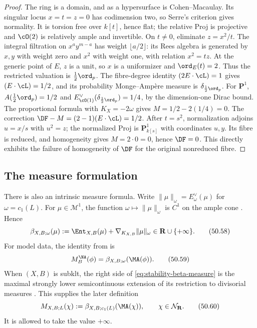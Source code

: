\begin{proof}
The ring is a domain, and as a hypersurface is Cohen--Macaulay.  Its
singular locus $x=t=z=0$ has codimension two, so Serre's criterion
gives normality.  It is torsion free over $k[t]$, hence flat; the
relative Proj is projective and $\cO(2)$ is relatively ample and
invertible.  On $t\ne0$, eliminate $z=x^2/t$.
The integral filtration on $x^ay^{m-a}$ has weight
$\lfloor a/2\rfloor$: its Rees algebra is generated by $x,y$
with weight zero and $x^2$ with weight one, with relation $x^2=tz$.
At the generic point of $E$, $z$ is a unit, so $x$ is a
uniformizer and $\ord_E(t)=2$.  Thus the restricted valuation is
$\frac12\ord_p$.  The fibre-degree identity
$(2E\cdot\cL)=1$ gives $(E\cdot\cL)=1/2$, and its probability
Monge--Amp\`ere measure is $\delta_{\frac12\ord_p}$.
For $\mathbf P^1$, $A(\frac12\ord_p)=1/2$ and
$E^\vee_{\cO(1)}(\delta_{\frac12\ord_p})=1/4$, by the dimension-one
Dirac bound.  The proportional formula with $K_X=-2\omega$ gives
$M=1/2-2(1/4)=0$.  The correction
$\DF-M=(2-1)(E\cdot\cL)=1/2$.
After $t=s^2$, normalization adjoins $u=x/s$ with $u^2=z$;
the normalized Proj is $\mathbf P^1_{k[s]}$ with coordinates $u,y$.
Its fibre is reduced, and homogeneity gives $M=2\cdot0=0$, hence
$\DF=0$.  This directly exhibits the failure of homogeneity of
$\DF$ for the original nonreduced fibre.
\end{proof}

\subsection{The measure formulation}
\label{sec:ch50-beta}

There is also an intrinsic measure formula.  Write
$\|\mu\|_\omega=E_\omega^\vee(\mu)$ for $\omega=c_1(L)$.  For
$\mu\in\mathcal M^1$, the function
$\omega\mapsto\|\mu\|_\omega$ is $C^1$ on the ample cone
\cite[Theorem~2.15]{BJKS2}.  Hence
\[
 \beta_{X,B;\omega}(\mu)
 :=\Ent_{X,B}(\mu)
       +\nabla_{K_{X,B}}\|\mu\|_\omega
 \in\mathbf R\cup\{+\infty\}.
\tag{50.58}\label{eq:stability-beta-measure}
\]
For model data, the identity from \cite[\S4.1, equations (4.4)--(4.5)]{BJKS2}
is
\[
       M_B^{\NA}(\phi)
       =\beta_{X,B;\omega}(\MA(\phi)).
\tag{50.59}\label{eq:stability-M-beta}
\]
When $(X,B)$ is subklt, the right side of
\eqref{eq:stability-beta-measure} is the maximal strongly lower
semicontinuous extension of its restriction to divisorial measures
\cite[\S\S3.4 and 4.1]{BJKS2}.  This supplies the later definition
\[
       M_{X,B;L}(\chi)
       :=\beta_{X,B;c_1(L)}(\MA(\chi)),
       \qquad\chi\in\mathcal N_{\mathbf R}.
\tag{50.60}\label{eq:stability-M-all-norms}
\]
It is allowed to take the value $+\infty$.

